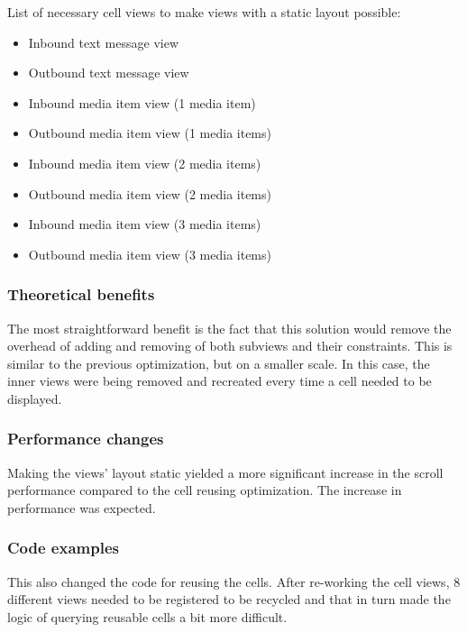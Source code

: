 \documentclass[a4paper,12pt]{article}
\begin{document}
List of necessary cell views to make views with a static layout possible:
\begin{itemize}
  \item Inbound text message view
  \item Outbound text message view
  \item Inbound media item view (1 media item)
  \item Outbound media item view (1 media items)
  \item Inbound media item view (2 media items)
  \item Outbound media item view (2 media items)
  \item Inbound media item view (3 media items)
  \item Outbound media item view (3 media items)
\end{itemize}

\subsubsection*{Theoretical benefits}
The most straightforward benefit is the fact that this solution would remove the overhead of adding and removing of both subviews and their constraints. This is similar to the previous optimization, but on a smaller scale. In this case, the inner views were being removed and recreated every time a cell needed to be displayed. 

\subsubsection*{Performance changes}
Making the views' layout static yielded a more significant increase in the scroll performance compared to the cell reusing optimization. The increase in performance was expected.


\subsubsection*{Code examples}
This also changed the code for reusing the cells. After re-working the cell views, 8 different views needed to be registered to be recycled and that in turn made the logic of querying reusable cells a bit more difficult.
\end{document}
